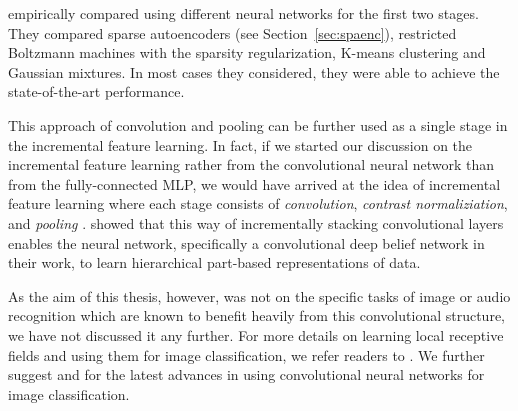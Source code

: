 \documentclass[dissertation,nocontribution,draft*]{aaltoseries}
\begin{document}
\citet{Coates2011} empirically compared using different
neural networks for the first two stages. They compared
sparse autoencoders (see Section~\ref{sec:spaenc}),
restricted Boltzmann machines with the sparsity
regularization, K-means clustering and Gaussian mixtures. In
most cases they considered, they were able to achieve the
state-of-the-art performance.

This approach of convolution and pooling can be further used
as a single stage in the incremental feature learning.  In
fact, if we started our discussion on the incremental
feature learning rather from the convolutional neural
network \citep[see, e.g.,][]{Lecun1998} than from the
fully-connected MLP, we would have arrived at the idea of
incremental feature learning where each stage consists of
\textit{convolution}, \textit{contrast normaliziation}, and
\textit{pooling} \citep[see, e.g.,][and references
therein]{Lecun2010}. \citet{Lee2009} showed that this way of
incrementally stacking convolutional layers enables the
neural network, specifically a convolutional deep belief
network in their work, to learn hierarchical part-based
representations of data.

As the aim of this thesis, however, was not on the specific
tasks of image or audio recognition which are known to
benefit heavily from this convolutional structure, we have
not discussed it any further. For more details on learning
local receptive fields and using them for image
classification, we refer readers to \citep{Coates2012t}. We
further suggest \citep{Krizhevsky2012} and
\citep{Ciresan2012b} for the latest advances in using
convolutional neural networks for image classification.











\end{document}
